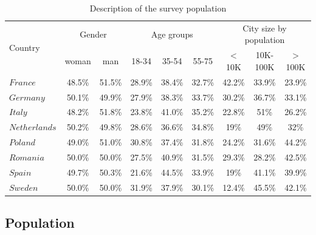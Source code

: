 \documentclass{article}
\begin{document}
\begin{table}
\centering
  \caption{Description of the survey population}
  \label{table1}
\begin{tabular}{l|cc|ccc|ccc}
\hline
    \multirow{2}{*}{Country} &
    \multicolumn{ 2}{|c}{Gender} & \multicolumn{ 3}{|c}{Age groups}  & \multicolumn{ 3}{|c}{City size by population} \\
    & woman & man & 18-34 & 35-54 & 55-75 & $<$ 10K & 10K-100K & $>$ 100K \\
    \hline

$France$ & 48.5\% & 51.5\% & 28.9\% & 38.4\% & 32.7\% & 42.2\% & 33.9\% & 23.9\%\\

$Germany$ & 50.1\% & 49.9\% & 27.9\% & 38.3\% & 33.7\% & 30.2\% & 36.7\% & 33.1\%\\

$Italy$ & 48.2\% & 51.8\% & 23.8\% & 41.0\% & 35.2\% & 22.8\% & 51\% & 26.2\%\\ 

$Netherlands$ & 50.2\% & 49.8\% & 28.6\% & 36.6\% & 34.8\% & 19\% & 49\% & 32\%\\

$Poland$ & 49.0\% & 51.0\% & 30.8\% & 37.4\% & 31.8\% & 24.2\% & 31.6\% & 44.2\%\\

$Romania$ & 50.0\% & 50.0\% & 27.5\% & 40.9\% & 31.5\% & 29.3\% & 28.2\% & 42.5\%\\


$Spain$ & 49.7\% & 50.3\% & 21.6\% & 44.5\% & 33.9\% & 19\% & 41.1\% & 39.9\%\\


$Sweden$ & 50.0\% & 50.0\% & 31.9\% & 37.9\% & 30.1\% & 12.4\% & 45.5\% & 42.1\%\\

\hline
\end{tabular}
\end{table}


\subsection{Population}%
\end{document}
